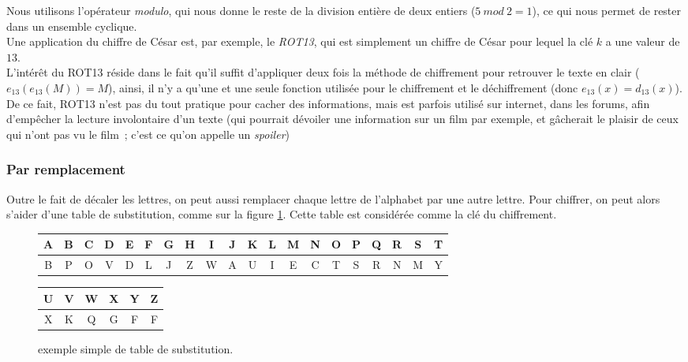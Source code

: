 Nous utilisons l'opérateur \emph{modulo}, qui nous donne le reste de
la division entière de deux entiers ($5~ mod~ 2 = 1$), ce qui nous
permet de rester dans un ensemble cyclique. \\

\label{syst:rot13}
Une application du chiffre de César est, par exemple, le \emph{ROT13},
qui est simplement un chiffre de César pour lequel la clé $k$ a une
valeur de $13$.\\

L'intérêt du ROT13 réside dans le fait qu'il suffit d'appliquer deux
fois la méthode de chiffrement pour retrouver le texte en clair
($e_{13}(e_{13}(M)) = M$), ainsi, il n'y a qu'une et une seule fonction utilisée
pour le chiffrement et le déchiffrement (donc $e_{13}(x) =
d_{13}(x)$). \\

De ce fait, ROT13 n'est pas du tout pratique pour cacher des
informations, mais est parfois utilisé sur internet, dans les forums,
afin d'empêcher la lecture involontaire d'un texte (qui pourrait
dévoiler une information sur un film par exemple, et gâcherait le
plaisir de ceux qui n'ont pas vu le film~; c'est ce qu'on appelle un 
\emph{spoiler}) 

\subsubsection{Par remplacement}
Outre le fait de décaler les lettres, on peut aussi remplacer chaque
lettre de l'alphabet par une autre lettre. Pour chiffrer, on peut alors
s'aider d'une table de substitution, comme sur la figure
\ref{fig:SubstitutionSimple}. Cette table est considérée comme la
clé du chiffrement.

 \begin{figure}[h]
   \begin{center}
    \begin{tabular}{|c|c|c|c|c|c|c|c|c|c|c|c|c|c|c|c|c|c|c|c}
      \hline
      A & B & C & D & E & F & G & H & I & J & K & L & M & N & O & P &
      Q & R & S & T \\
      \hline
      B & P & O & V & D & L & J & Z & W & A & U & I & E & C & T & S &
      R & N & M & Y \\
      \hline
    \end{tabular}
  \end{center}
  \begin{flushright}
    \begin{tabular}{c|c|c|c|c|c|}
      \hline
      U & V & W & X & Y & Z \\
      \hline
      X & K & Q & G & F & F \\
      \hline
    \end{tabular}
  \end{flushright}
  \caption{exemple simple de table de substitution.}
  \label{fig:SubstitutionSimple}
\end{figure}


